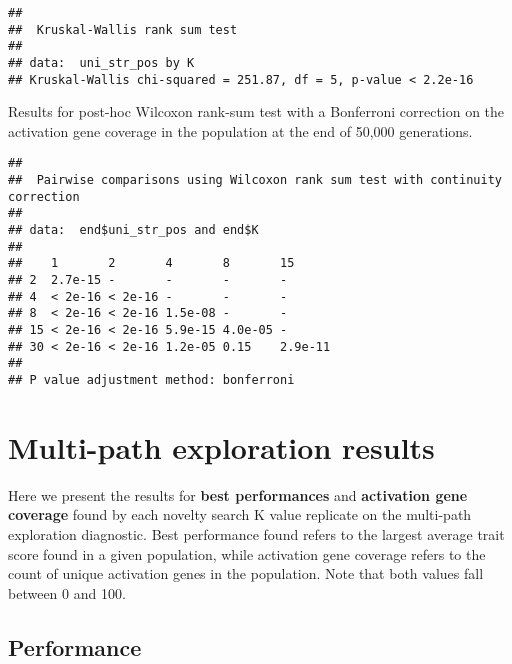 \documentclass[]{book}
\newenvironment{Shaded}{\begin{snugshade}}{\end{snugshade}}
\newcommand{\DataTypeTok}[1]{\textcolor[rgb]{0.13,0.29,0.53}{#1}}
\newcommand{\KeywordTok}[1]{\textcolor[rgb]{0.13,0.29,0.53}{\textbf{#1}}}
\newcommand{\NormalTok}[1]{#1}
\newcommand{\OperatorTok}[1]{\textcolor[rgb]{0.81,0.36,0.00}{\textbf{#1}}}
\newcommand{\OtherTok}[1]{\textcolor[rgb]{0.56,0.35,0.01}{#1}}
\newcommand{\StringTok}[1]{\textcolor[rgb]{0.31,0.60,0.02}{#1}}
\begin{document}
\begin{verbatim}
## 
##  Kruskal-Wallis rank sum test
## 
## data:  uni_str_pos by K
## Kruskal-Wallis chi-squared = 251.87, df = 5, p-value < 2.2e-16
\end{verbatim}

Results for post-hoc Wilcoxon rank-sum test with a Bonferroni correction on the activation gene coverage in the population at the end of 50,000 generations.

\begin{Shaded}
\end{Shaded}

\begin{verbatim}
## 
##  Pairwise comparisons using Wilcoxon rank sum test with continuity correction 
## 
## data:  end$uni_str_pos and end$K 
## 
##    1       2       4       8       15     
## 2  2.7e-15 -       -       -       -      
## 4  < 2e-16 < 2e-16 -       -       -      
## 8  < 2e-16 < 2e-16 1.5e-08 -       -      
## 15 < 2e-16 < 2e-16 5.9e-15 4.0e-05 -      
## 30 < 2e-16 < 2e-16 1.2e-05 0.15    2.9e-11
## 
## P value adjustment method: bonferroni
\end{verbatim}

\hypertarget{multi-path-exploration-results-6}{%
\section{Multi-path exploration results}\label{multi-path-exploration-results-6}}

Here we present the results for \textbf{best performances} and \textbf{activation gene coverage} found by each novelty search K value replicate on the multi-path exploration diagnostic.
Best performance found refers to the largest average trait score found in a given population, while activation gene coverage refers to the count of unique activation genes in the population.
Note that both values fall between 0 and 100.

\hypertarget{performance-6}{%
\subsection{Performance}\label{performance-6}}
\end{document}
